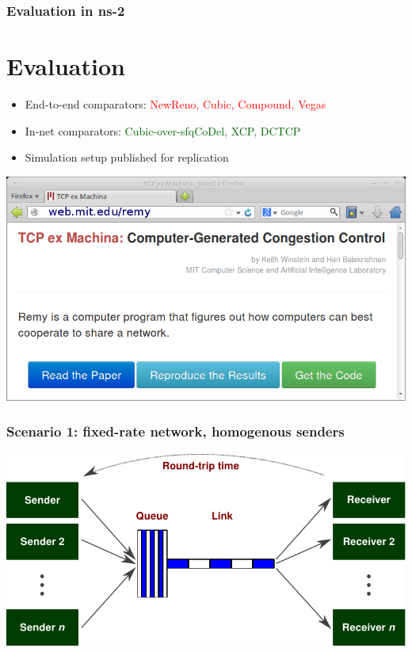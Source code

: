 \documentclass[svgnames]{beamer}
\begin{document}
\begin{frame}
\frametitle{Evaluation in ns-2}

\section{Evaluation}

\begin{itemize}

\item End-to-end comparators: \textcolor{Red}{NewReno, Cubic, Compound, Vegas}

\item In-net comparators: \textcolor{DarkGreen}{Cubic-over-sfqCoDel, XCP, DCTCP}

\item Simulation setup published for replication

\end{itemize}

\begin{centering}
\includegraphics[width=9 cm]{reproducethis.png}

\end{centering}

\end{frame}

\begin{frame}
\frametitle{Scenario 1: fixed-rate network, homogenous senders}

\includegraphics[width=\textwidth]{dumbbell.pdf}

\end{frame}
\end{document}
